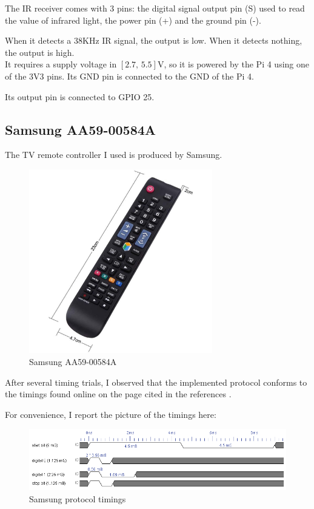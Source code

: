 \documentclass[a4paper, 12pt]{article}
\begin{document}
The IR receiver comes with 3 pins: the digital signal output pin (S) used to read the value of infrared light, the power pin (+) and the ground pin (-).

When it detects a 38KHz IR signal, the output is low. When it detects nothing, the output is high. \\
It requires a supply voltage in $[2.7, \, 5.5]$V, so it is powered by the Pi 4 using one of the 3V3 pins. Its GND pin is connected to the GND of the Pi 4.

Its output pin is connected to GPIO 25.

\subsection{Samsung AA59-00584A}

The TV remote controller I used is produced by Samsung.

\begin{figure}[h]
    \centering
    \includegraphics[width=8cm]{remote_controller}
    \caption{Samsung AA59-00584A}
\end{figure}

After several timing trials, I observed that the implemented protocol conforms to the timings found online on the page cited in the references \cite{8Samsung}. 

For convenience, I report the picture of the timings here:

\begin{figure}[h]
    \centering
    \includegraphics[width=15cm]{8_samsung}
    \caption{Samsung protocol timings}
\end{figure}
\end{document}
